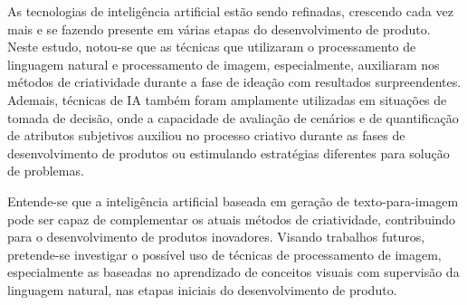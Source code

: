 As tecnologias de inteligência artificial estão sendo refinadas, crescendo cada vez mais e se fazendo presente em várias etapas do desenvolvimento de produto. Neste estudo, notou-se que as técnicas que utilizaram o processamento de linguagem natural e processamento de imagem, especialmente, auxiliaram nos métodos de criatividade durante a fase de ideação com resultados surpreendentes. Ademais, técnicas de IA também foram amplamente utilizadas em situações de tomada de decisão, onde a capacidade de avaliação de cenários e de quantificação de atributos subjetivos auxiliou no processo criativo durante as fases de desenvolvimento de produtos ou estimulando estratégias diferentes para solução de problemas.

Entende-se que a inteligência artificial baseada em geração de texto-para-imagem pode ser capaz de complementar os atuais métodos de criatividade, contribuindo para o desenvolvimento de produtos inovadores. Visando trabalhos futuros, pretende-se investigar o possível uso de técnicas de processamento de imagem, especialmente as baseadas no aprendizado de conceitos visuais com supervisão da linguagem natural, nas etapas iniciais do desenvolvimento de produto. 
